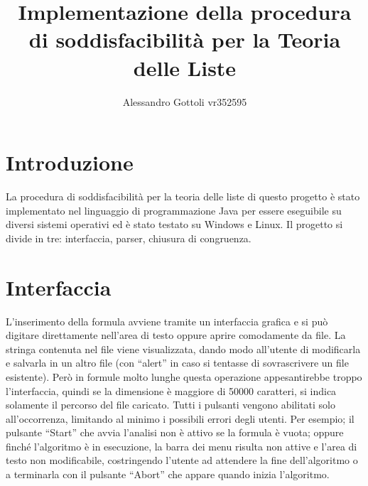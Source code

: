 \documentclass[a4paper,11pt]{article} %
\begin{document}
\title{Implementazione della procedura di soddisfacibilit\`a per la Teoria delle Liste}
\author{Alessandro Gottoli vr352595}
\maketitle

\section*{Introduzione}
La procedura di soddisfacibilit\`a per la teoria delle liste
di questo progetto \`e stato implementato nel linguaggio di 
programmazione Java per essere eseguibile su diversi sistemi
operativi ed \`e stato testato su Windows e Linux.
Il progetto si divide in tre: interfaccia, parser, chiusura di congruenza.
\vspace{-1ex}
\section{Interfaccia}\label{sec: interfaccia}
L'inserimento della formula avviene tramite un interfaccia grafica e si pu\`o
digitare direttamente nell'area di testo oppure aprire comodamente da file. La
stringa contenuta nel file viene visualizzata, dando modo all'utente di modificarla
e salvarla in un altro file (con ``alert'' in caso si tentasse di sovrascrivere un file esistente).
Per\`o in formule molto lunghe questa operazione appesantirebbe troppo l'interfaccia, 
quindi se la dimensione \`e maggiore di 50000 caratteri, si indica solamente il percorso del file
caricato.
Tutti i pulsanti vengono abilitati solo all'occorrenza, limitando al minimo i possibili errori degli utenti.
Per esempio; %
il pulsante ``Start'' %
che avvia l'analisi non \`e attivo se la formula \`e vuota; 
oppure finch\'e l'algoritmo \`e in esecuzione, la barra %
dei menu
risulta non attive e l'area di testo non modificabile, 
costringendo l'utente ad attendere la fine dell'algoritmo 
o a terminarla con il pulsante ``Abort'' che appare quando inizia l'algoritmo.
\end{document}
